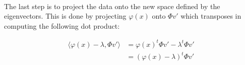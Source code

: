 \paragraph{} The last step is to project the data onto the new space defined by
the eigenvectors.  This is done by projecting $\varphi(x)$ onto $\Phi v'$ which
transposes in computing the following dot product:

\begin{align*}
\langle\varphi(x) - \lambda, \Phi v'\rangle &= \varphi(x)^t\Phi v' - \lambda^t\Phi v' \\
&= (\varphi(x) - \lambda)^t\Phi v'
\end{align*}
